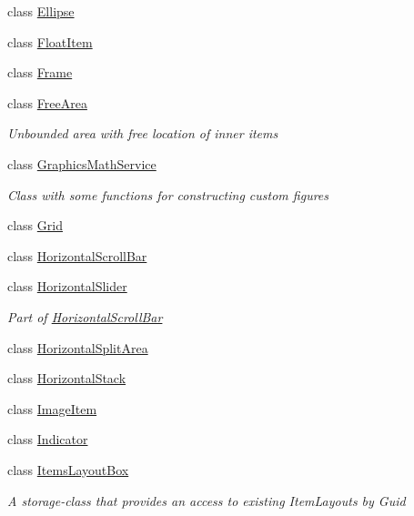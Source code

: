 \begin{DoxyCompactItemize}
\item 
class \mbox{\hyperlink{class_space_v_i_l_1_1_ellipse}{Ellipse}}
\item 
class \mbox{\hyperlink{class_space_v_i_l_1_1_float_item}{Float\+Item}}
\item 
class \mbox{\hyperlink{class_space_v_i_l_1_1_frame}{Frame}}
\item 
class \mbox{\hyperlink{class_space_v_i_l_1_1_free_area}{Free\+Area}}
\begin{DoxyCompactList}\small\item\em Unbounded area with free location of inner items \end{DoxyCompactList}\item 
class \mbox{\hyperlink{class_space_v_i_l_1_1_graphics_math_service}{Graphics\+Math\+Service}}
\begin{DoxyCompactList}\small\item\em Class with some functions for constructing custom figures \end{DoxyCompactList}\item 
class \mbox{\hyperlink{class_space_v_i_l_1_1_grid}{Grid}}
\item 
class \mbox{\hyperlink{class_space_v_i_l_1_1_horizontal_scroll_bar}{Horizontal\+Scroll\+Bar}}
\item 
class \mbox{\hyperlink{class_space_v_i_l_1_1_horizontal_slider}{Horizontal\+Slider}}
\begin{DoxyCompactList}\small\item\em Part of \mbox{\hyperlink{class_space_v_i_l_1_1_horizontal_scroll_bar}{Horizontal\+Scroll\+Bar}} \end{DoxyCompactList}\item 
class \mbox{\hyperlink{class_space_v_i_l_1_1_horizontal_split_area}{Horizontal\+Split\+Area}}
\item 
class \mbox{\hyperlink{class_space_v_i_l_1_1_horizontal_stack}{Horizontal\+Stack}}
\item 
class \mbox{\hyperlink{class_space_v_i_l_1_1_image_item}{Image\+Item}}
\item 
class \mbox{\hyperlink{class_space_v_i_l_1_1_indicator}{Indicator}}
\item 
class \mbox{\hyperlink{class_space_v_i_l_1_1_items_layout_box}{Items\+Layout\+Box}}
\begin{DoxyCompactList}\small\item\em A storage-\/class that provides an access to existing Item\+Layouts by Guid \end{DoxyCompactList}\item 

\end{DoxyCompactItemize}
